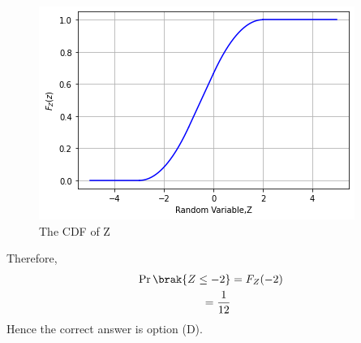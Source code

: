 \documentclass[journal,12pt,twocolumn]{IEEEtran}
\begin{document}
\begin{figure}[!ht]
       \centering
    \includegraphics[width=.9\columnwidth] {Assignment_4_Fig_2.png}
    \caption{The CDF of Z}
    \label{fig:The CDF of Z}
\end{figure}
Therefore,
\begin{align}
    \Pr\brak{ Z \leq -2} &= F_{Z}(-2) \\
                  = \dfrac{1}{12}
\end{align}
Hence the correct answer is option (D).
\end{document}
